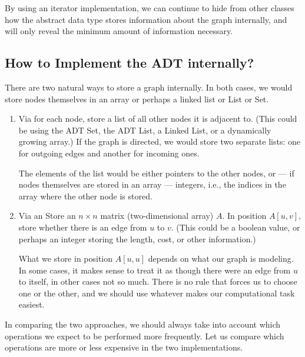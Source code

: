 By using an iterator implementation, we can continue to hide from
other classes how the abstract data type stores information about the
graph internally, and will only reveal the minimum amount of
information necessary.

\subsection{How to Implement the ADT internally?}

There are two natural ways to store a graph internally.
In both cases, we would store nodes themselves in an array or perhaps
a linked list or List or Set.
\begin{enumerate}
\item Via  for each node, store a list of all
  other nodes it is adjacent to. (This could be using the ADT Set, the
  ADT List, a Linked List, or a dynamically growing array.)
  If the graph is directed, we would store two separate lists: one for
  outgoing edges and another for incoming ones.

  The elements of the list would be either pointers to the other
  nodes, or --- if nodes themselves are stored in an array ---
  integers, i.e., the indices in the array where the other node is
  stored. 

\item Via an  Store an $n \times n$ matrix
  (two-dimensional array) $A$. In position $A[u,v]$, store whether
  there is an edge from $u$ to $v$. (This could be a boolean value, or
  perhaps an integer storing the length, cost, or other information.)

  What we store in position $A[u,u]$ depends on what our graph is
  modeling. In some cases, it makes sense to treat it as though there
  were an edge from $u$ to itself, in other cases not so much. There
  is no rule that forces us to choose one or the other, and we should
  use whatever makes our computational task easiest.
\end{enumerate}

In comparing the two approaches, we should always take into account
which operations we expect to be performed more frequently. Let us
compare which operations are more or less expensive in the two
implementations.

